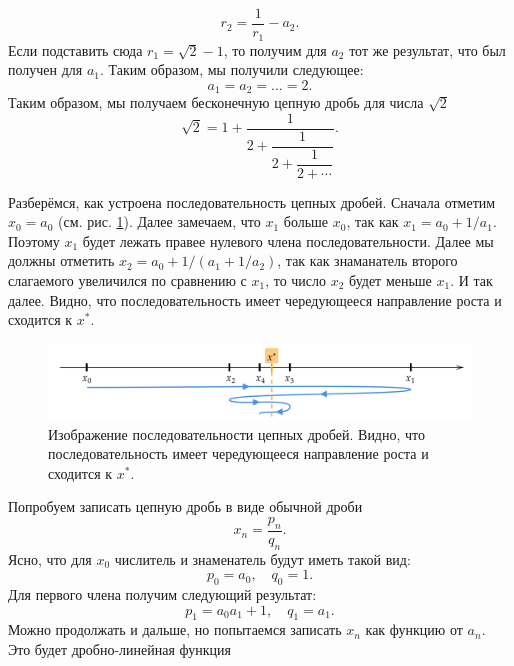 \documentclass[12pt]{article}
\begin{document}
\begin{equation}
    r_2 = \dfrac{1}{r_1} - a_2.
\end{equation}
Если подставить сюда $r_1 = \sqrt{2} - 1$, то получим для $a_2$ тот же результат, что был получен для $a_1$. Таким образом, мы получили следующее:
\begin{equation}
    a_1 = a_2 = \ldots = 2.
\end{equation}
Таким образом, мы получаем бесконечную цепную дробь для числа $\sqrt{2}$
\begin{equation}
    \sqrt{2} = 1 + \dfrac{1}{2+\dfrac{1}{2+\dfrac{1}{2+\cdots}}}.
\end{equation}
\par
Разберёмся, как устроена последовательность цепных дробей. Сначала отметим $x_0 = a_0$ (см. рис. \ref{fig:5}). Далее замечаем, что $x_1$ больше $x_0$, так как $x_1 = a_0 + 1/a_1$. Поэтому $x_1$ будет лежать правее нулевого члена последовательности. Далее мы должны отметить $x_2 = a_0 + 1/(a_1+ 1/a_2)$, так как знаманатель второго слагаемого увеличился по сравнению с $x_1$, то число $x_2$ будет меньше $x_1$. И так далее. Видно, что последовательность имеет чередующееся направление роста и сходится к $x^*$.
\begin{figure}
    \centering
    \includegraphics[width = 1\textwidth]{fig5.png}
    \caption{Изображение последовательности цепных дробей. Видно, что последовательность имеет чередующееся направление роста и сходится к $x^*$.}
    \label{fig:5}
\end{figure}
\par
Попробуем записать цепную дробь в виде обычной дроби
\begin{equation}
    x_n = \dfrac{p_n}{q_n}.
\end{equation}
Ясно, что для $x_0$ числитель и знаменатель будут иметь такой вид:
\begin{equation}\label{eq:58}
    p_0 = a_0,\quad q_0 = 1.
\end{equation}
Для первого члена получим следующий результат:
\begin{equation}\label{eq:59}
    p_1 = a_0 a_1 + 1,\quad q_1 = a_1.
\end{equation}
Можно продолжать и дальше, но попытаемся записать $x_n$ как функцию от $a_n$. Это будет дробно\--линейная функция
\end{document}
